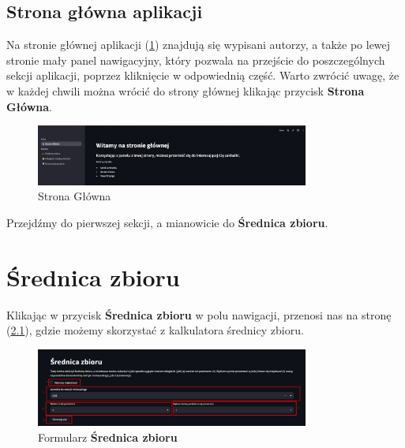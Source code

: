 \documentclass[article,11pt]{mwrep}
\begin{document}
\section{Strona główna aplikacji}

Na stronie głównej aplikacji (\ref{rys:sg}) znajdują się wypisani autorzy, a także po lewej stronie mały panel nawigacyjny, który pozwala na przejście do poszczególnych sekcji aplikacji, poprzez kliknięcie w odpowiednią część. Warto zwrócić uwagę, że w każdej chwili można wrócić do strony głównej klikając przycisk \textbf{Strona Główna}. 

\begin{figure}[H] 
    \centering
    \includegraphics[width=0.8\textwidth]{figure/Screenshot_1.jpg}
    \caption{Strona Główna}\label{rys:sg}
\end{figure}

Przejdźmy do pierwszej sekcji, a mianowicie do \textbf{Średnica zbioru}.

\chapter{Średnica zbioru}

Klikając w przycisk \textbf{Średnica zbioru} w polu nawigacji, przenosi nas na stronę (\ref{rys:sz}), gdzie możemy skorzystać z kalkulatora średnicy zbioru. 

\begin{figure}[H] 
    \centering
    \includegraphics[width=0.8\textwidth]{figure/Screenshot_2.jpg}
    \caption{Formularz \textbf{Średnica zbioru}}\label{rys:sz}
\end{figure}
\end{document}
